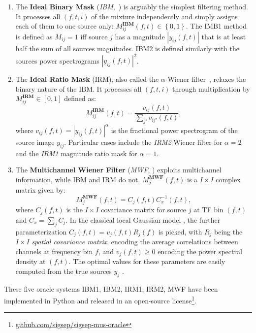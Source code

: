 \documentclass{article}
\newcommand{\sboxed}[1]{\textbf{#1}}
\newcommand{\ft}{\left(f,t\right)}
\begin{document}
\begin{enumerate}
  \item The \textbf{Ideal Binary Mask} (\textit{IBM},~\cite{wang2005}) is arguably the simplest filtering method. It processes all $\left(f,t,i\right)$ of the mixture independently and simply assigns each of them to one source only:   $M_{ij}^\sboxed{IBM}\ft\in\left\{0,1\right\}$. The IMB1 method is defined as $M_{ij}=1$ iff source $j$ has a magnitude $\left|y_{ij}(f,t)\right|$ that is at least half the sum of all sources magnitudes. IBM2 is defined similarly with the sources power spectrograms $\left|y_{ij}(f,t)\right|^2$.
  \item The \textbf{Ideal Ratio Mask} (IRM), also called the $\alpha$-Wiener filter~\cite{liutkus15}, relaxes the binary nature of the IBM. It processes all $\left(f,t,i\right)$ through multiplication by $M_{ij}^\sboxed{IRM}\in\left[0,1\right]$ defined as:
  \begin{equation}
    M^{\sboxed{IRM}}_{ij}\ft=\frac{v_{ij}\ft}{\sum_{j'}v_{ij'}\ft},
  \end{equation}
where $v_{ij}\ft=\left|y_{ij}\ft\right|^\alpha$ is the fractional power spectrogram of the source image $y_{ij}$. Particular cases include the \textit{IRM2} Wiener filter for $\alpha=2$ and the \textit{IRM1} magnitude ratio mask for $\alpha=1$.
  \item The \textbf{Multichannel Wiener Filter} (\textit{MWF}, \cite{duong10}) exploits multichannel information, while IBM and IRM do not. $M^{\sboxed{MWF}}_{j}\ft$ is a $I\times I$ complex matrix given by:
  \begin{equation}
    M_{j}^{\sboxed{MWF}}\ft=C_{j}\ft C_{x}^{-1}\ft,
  \end{equation}
where $C_j\ft$ is the $I\times I$ covariance matrix for source $j$ at TF bin $\ft$ and $C_x=\sum_j C_j$. In the classical local Gaussian model \cite{duong10}, the further parameterization $C_j\ft=v_j\ft R_j\left(f\right)$ is picked, with $R_j$ being the $I\times I$ \textit{spatial covariance matrix}, encoding the average correlations between channels at frequency bin $f$, and $v_j\ft\geq0$ encoding the power spectral density at $\ft$. The optimal values for these parameters are easily computed from the true sources $y_j$ \cite{liutkus2013}.
\end{enumerate}

These five oracle systems IBM1, IBM2, IRM1, IRM2, MWF have been implemented in Python and released in an open-source license\footnote{\url{github.com/sigsep/sigsep-mus-oracle}}.
\end{document}
